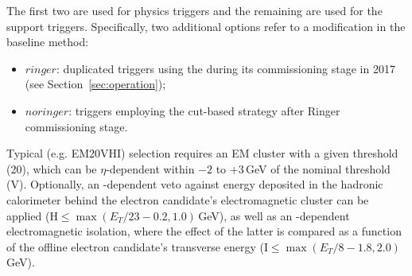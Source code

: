 The first two are used for physics triggers and the remaining are used
for the support triggers. Specifically, two additional options refer to
a modification in the \fastcalo{} baseline method:

\begin{itemize}
\item $ringer$: duplicated triggers using the \rnn during its
  commissioning stage in 2017 (see Section~\ref{sec:operation});
\item $noringer$: triggers employing the cut-based strategy after Ringer
  commissioning stage.
\end{itemize}


Typical \licalo (e.g. EM20VHI) selection requires an EM cluster with a
given threshold (20), which can be  $\eta$-dependent within $-2$ to $+3\,$GeV
of the nominal threshold (V). Optionally, an \et-dependent veto against energy
deposited in the hadronic calorimeter behind the electron candidate's
electromagnetic cluster can be applied (H$\le \max(E_T/23-0.2, 1.0)\,$GeV), as
well as an \et-dependent electromagnetic isolation, where the effect of the
latter is compared as a function of the offline electron candidate's transverse
energy (I$\le \max(E_T/8-1.8, 2.0)\,$GeV).


